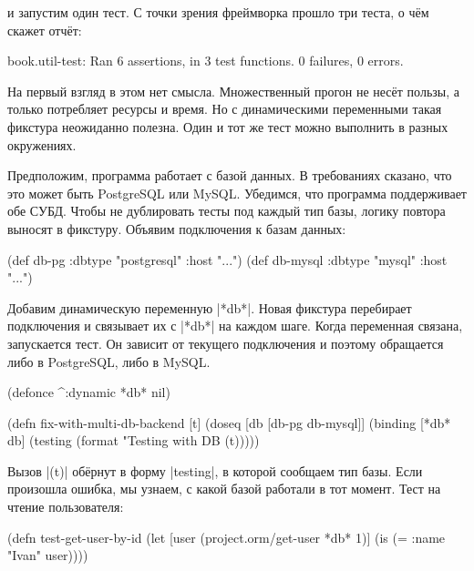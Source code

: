 \noindent
и запустим один тест. С точки зрения фреймворка прошло три теста, о чём скажет
отчёт:

\begin{english}
  \begin{text}
book.util-test: Ran 6 assertions, in 3 test functions.
0 failures, 0 errors.
  \end{text}
\end{english}

На первый взгляд в этом нет смысла. Множественный прогон не несёт пользы, а
только потребляет ресурсы и время. Но с динамическими переменными такая фикстура
неожиданно полезна. Один и тот же тест можно выполнить в разных окружениях.

Предположим, программа работает с базой данных. В требованиях сказано, что это
может быть PostgreSQL или MySQL. Убедимся, что программа поддерживает обе
СУБД. Чтобы не дублировать тесты под каждый тип базы, логику повтора выносят в
фикстуру. Объявим подключения к базам данных:


\begin{english}
  \begin{clojure}
(def db-pg {:dbtype "postgresql" :host "..."})
(def db-mysql {:dbtype "mysql" :host "..."})
  \end{clojure}
\end{english}

Добавим динамическую переменную \spverb|*db*|. Новая фикстура перебирает
подключения и связывает их с \spverb|*db*| на каждом шаге. Когда переменная
связана, запускается тест. Он зависит от текущего подключения и поэтому
обращается либо в PostgreSQL, либо в MySQL.

\begin{english}
  \begin{clojure}
(defonce ^:dynamic *db* nil)

(defn fix-with-multi-db-backend [t]
  (doseq [db [db-pg db-mysql]]
    (binding [*db* db]
      (testing (format "Testing with DB %
        (t)))))
  \end{clojure}
\end{english}

Вызов \spverb|(t)| обёрнут в форму \spverb|testing|, в которой сообщаем тип
базы. Если произошла ошибка, мы узнаем, с какой базой работали в тот
момент. Тест на чтение пользователя:

\begin{english}
  \begin{clojure}
(defn test-get-user-by-id
  (let [user (project.orm/get-user *db* 1)]
    (is (= {:name "Ivan"} user))))
  \end{clojure}
\end{english}

